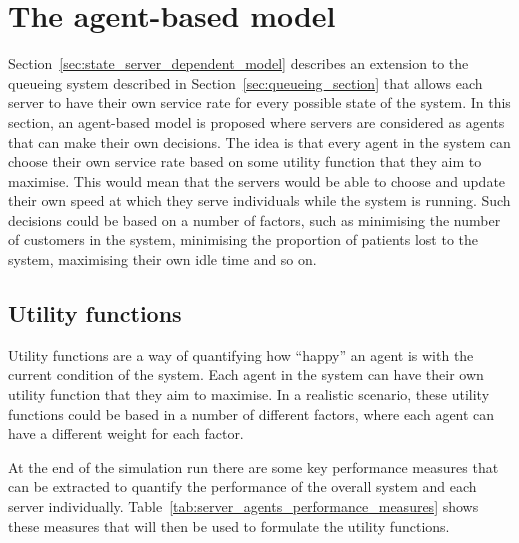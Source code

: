\section{The agent-based model}\label{sec:agent_based_model}

Section~\ref{sec:state_server_dependent_model} describes an extension to the
queueing system described in Section~\ref{sec:queueing_section} that allows
each server to have their own service rate for every possible state of the
system.
In this section, an agent-based model is proposed where servers are considered
as agents that can make their own decisions.
The idea is that every agent in the system can choose their own service rate
based on some utility function that they aim to maximise.
This would mean that the servers would be able to choose and update their own
speed at which they serve individuals while the system is running.
Such decisions could be based on a number of factors, such as minimising the
number of customers in the system, minimising the proportion of patients lost
to the system, maximising their own idle time and so on.

\subsection{Utility functions}

Utility functions are a way of quantifying how ``happy'' an agent is with the
current condition of the system.
Each agent in the system can have their own utility function that they aim to
maximise.
In a realistic scenario, these utility functions could be based in a number of
different factors, where each agent can have a different weight for each
factor.

At the end of the simulation run there are some key performance measures that
can be extracted to quantify the performance of the overall system and each
server individually.
Table~\ref{tab:server_agents_performance_measures} shows these measures that
will then be used to formulate the utility functions.

